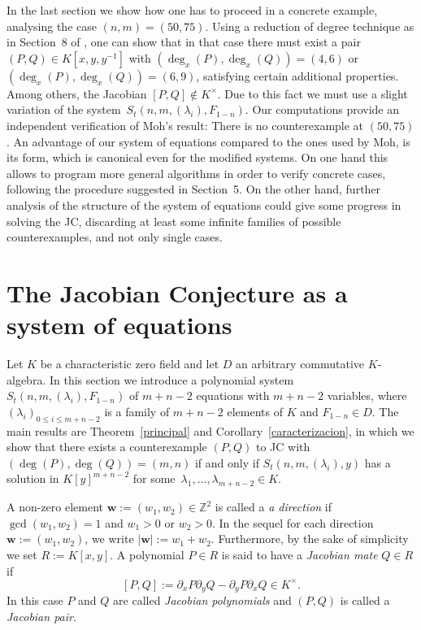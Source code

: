 \documentclass[reqno,a4paper]{amsart}
\theoremstyle{definition}
\theoremstyle{remark}
\begin{document}
In the last section we show how one has to proceed in a concrete example, analysing the case
$(n,m)=(50,75)$. Using a reduction of degree technique as in Section~8 of \cite{GGV1}, one
can show that in that case there must exist a pair $(P,Q)\in K[x,y,y^{-1}]$ with
$(\deg_x(P),\deg_x(Q))=(4,6)$ or $(\deg_x(P),\deg_x(Q))=(6,9)$, satisfying certain additional
properties. Among others, the Jacobian $[P,Q]\notin K^{\times}$. Due to this fact we must use
a slight variation of the system~$S_t(n,m,(\lambda_i),F_{1-n})$. Our computations provide an
independent verification of Moh's result: There is no counterexample at $(50,75)$. An advantage
of our system of equations compared to the ones used by Moh, is its form, which is canonical
even for the modified systems. On one hand this allows to program more general algorithms in
order to verify concrete cases, following the procedure suggested in Section~5. On the other
hand, further analysis of the structure of the system of equations could give some progress
in solving the JC, discarding at least some infinite families of possible counterexamples,
and not only single cases.

\section{The Jacobian Conjecture as a system of equations}
%
Let $K$ be a characteristic zero field and let $D$ an arbitrary commutative $K$-algebra. In
this section we introduce a polynomial system $S_t(n,m,(\lambda_i),F_{1-n})$ of $m+n-2$
equations with $m+n-2$ variables, where $(\lambda_i)_{0\le i\le m+n-2}$ is a family of
$m+n-2$ elements of $K$ and $F_{1-n}\in D$. The main results are Theorem~\ref{principal}
and Corollary~\ref{caracterizacion}, in which we show that there exists a counterexample
$(P,Q)$ to JC with $(\deg(P),\deg(Q))=(m,n)$ if and only if  $S_t(n,m,(\lambda_i),y)$ has
a solution in $K[y]^{m+n-2}$ for some~$\lambda_1,\dots, \lambda_{m+n-2}\in K$.

A non-zero element $\mathbf{w}:=(w_1,w_2)\in \mathds{Z}^2$ is  called a {\em a direction}
if $\gcd(w_1,w_2) = 1$ and $w_1>0$ or $w_2>0$. In the sequel for each direction
$\mathbf{w}:=(w_1,w_2)$, we write $|\mathbf{w}|:=w_1+w_2$. Furthermore, by the sake of
simplicity we set $R:= K[x,y]$. A polynomial $P\in R$ is said to have a {\em Jacobian mate}
$Q\in R$ if
$$
[P,Q] := \partial_x P \partial_y Q -  \partial_y P \partial_x Q \in K^{\times}.
$$
In this case $P$ and $Q$ are called {\em  Jacobian polynomials} and $(P,Q)$ is called a
{\em Jacobian pair}.
\end{document}

